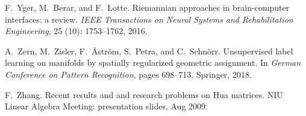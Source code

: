\documentclass[11pt]{article}
\begin{document}
\begin{thebibliography}{33}
F.~Yger, M.~Berar, and F.~Lotte.
\newblock Riemannian approaches in brain-computer interfaces: a review.
\newblock \emph{IEEE Transactions on Neural Systems and Rehabilitation
  Engineering}, 25 (10): 1753--1762, 2016.

A.~Zern, M.~Zisler, F.~{\AA}str{\"o}m, S.~Petra, and C.~Schn{\"o}rr.
\newblock Unsupervised label learning on manifolds by spatially regularized
  geometric assignment.
\newblock In \emph{German Conference on Pattern Recognition}, pages 698--713.
  Springer, 2018.

F.~Zhang.
\newblock Recent results and and research problems on {H}ua matrices.
\newblock NIU Linear Algebra Meeting: presentation slides, Aug 2009.

\end{thebibliography}
\end{document}
